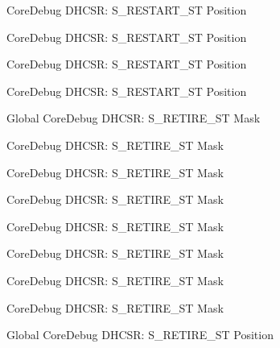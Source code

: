 \begin{DoxyRefList}
\label{deprecated__deprecated000458}%
%
Core\+Debug DHCSR\+: S\+\_\+\+RESTART\+\_\+\+ST Position 

\label{deprecated__deprecated000246}%
%
Core\+Debug DHCSR\+: S\+\_\+\+RESTART\+\_\+\+ST Position 

\label{deprecated__deprecated000303}%
%
Core\+Debug DHCSR\+: S\+\_\+\+RESTART\+\_\+\+ST Position 

\label{deprecated__deprecated000161}%
%
Core\+Debug DHCSR\+: S\+\_\+\+RESTART\+\_\+\+ST Position  
\item[Global \doxylink{group___c_m_s_i_s___core_debug_ga89dceb5325f6bcb36a0473d65fbfcfa6}{Core\+Debug\+\_\+\+DHCSR\+\_\+\+S\+\_\+\+RETIRE\+\_\+\+ST\+\_\+\+Msk} ]\label{deprecated__deprecated000308}%
%
Core\+Debug DHCSR\+: S\+\_\+\+RETIRE\+\_\+\+ST Mask 

\label{deprecated__deprecated000565}%
%
Core\+Debug DHCSR\+: S\+\_\+\+RETIRE\+\_\+\+ST Mask 

\label{deprecated__deprecated000463}%
%
Core\+Debug DHCSR\+: S\+\_\+\+RETIRE\+\_\+\+ST Mask 

\label{deprecated__deprecated000384}%
%
Core\+Debug DHCSR\+: S\+\_\+\+RETIRE\+\_\+\+ST Mask 

\label{deprecated__deprecated000166}%
%
Core\+Debug DHCSR\+: S\+\_\+\+RETIRE\+\_\+\+ST Mask 

\label{deprecated__deprecated000251}%
%
Core\+Debug DHCSR\+: S\+\_\+\+RETIRE\+\_\+\+ST Mask 

\label{deprecated__deprecated000012}%
%
Core\+Debug DHCSR\+: S\+\_\+\+RETIRE\+\_\+\+ST Mask 

\label{deprecated__deprecated000112}%
%
Core\+Debug DHCSR\+: S\+\_\+\+RETIRE\+\_\+\+ST Mask  
\item[Global \doxylink{group___c_m_s_i_s___core_debug_ga2328118f8b3574c871a53605eb17e730}{Core\+Debug\+\_\+\+DHCSR\+\_\+\+S\+\_\+\+RETIRE\+\_\+\+ST\+\_\+\+Pos} ]\label{deprecated__deprecated000462}%
%
Core\+Debug DHCSR\+: S\+\_\+\+RETIRE\+\_\+\+ST Position 


\end{DoxyRefList}

